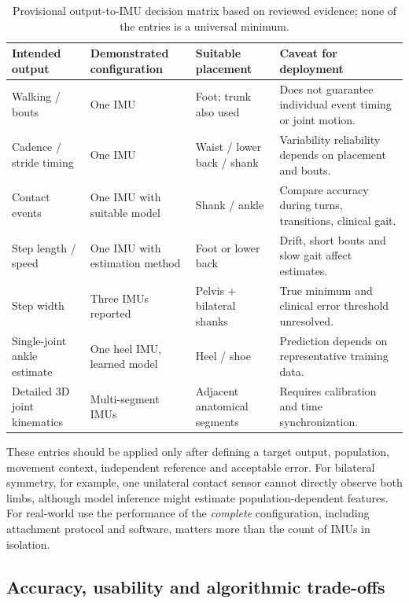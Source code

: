 \documentclass[10pt,a4paper,twocolumn]{article}
\begin{document}
\begin{table}[!t]
 \centering\footnotesize
 \caption{Provisional output-to-IMU decision matrix based on reviewed evidence; none of the entries is a universal minimum.}
 \label{tab:decision}
 \begin{tabularx}{\linewidth}{@{}p{2.25cm}p{2.2cm}YY@{}}
 \toprule
 Intended output & Demonstrated configuration & Suitable placement & Caveat for deployment \\
 \midrule
 Walking / bouts & One IMU \citep{prigent2023} & Foot; trunk also used & Does not guarantee individual event timing or joint motion. \\
 Cadence / stride timing & One IMU \citep{rantalainen2020,mico2023} & Waist / lower back / shank & Variability reliability depends on placement and bouts. \\
 Contact events & One IMU with suitable model \citep{romijnders2022} & Shank / ankle & Compare accuracy during turns, transitions, clinical gait. \\
 Step length / speed & One IMU with estimation method \citep{guimaraes2021,zadka2024} & Foot or lower back & Drift, short bouts and slow gait affect estimates. \\
 Step width & Three IMUs reported \citep{wang2025h} & Pelvis + bilateral shanks & True minimum and clinical error threshold unresolved. \\
 Single-joint ankle estimate & One heel IMU, learned model \citep{wang2025l} & Heel / shoe & Prediction depends on representative training data. \\
 Detailed 3D joint kinematics & Multi-segment IMUs \citep{niswander2020} & Adjacent anatomical segments & Requires calibration and time synchronization. \\
 \bottomrule
 \end{tabularx}
\end{table}

These entries should be applied only after defining a target output, population, movement context, independent reference and acceptable error. For bilateral symmetry, for example, one unilateral contact sensor cannot directly observe both limbs, although model inference might estimate population-dependent features. For real-world use the performance of the \emph{complete} configuration, including attachment protocol and software, matters more than the count of IMUs in isolation.

\subsection{Accuracy, usability and algorithmic trade-offs}
\label{sec:disc-tradeoff}
\end{document}
